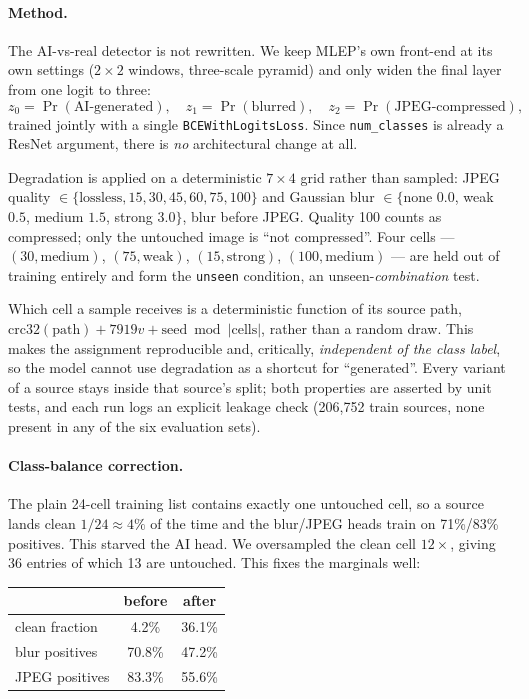\paragraph{Method.} The AI-vs-real detector is not rewritten. We keep MLEP's own
front-end at its own settings ($2\times2$ windows, three-scale pyramid) and only
widen the final layer from one logit to three:
\[
  z_0 = \Pr(\text{AI-generated}), \quad
  z_1 = \Pr(\text{blurred}), \quad
  z_2 = \Pr(\text{JPEG-compressed}),
\]
trained jointly with a single \texttt{BCEWithLogitsLoss}. Since \texttt{num\_classes}
is already a ResNet argument, there is \emph{no} architectural change at all.

Degradation is applied on a deterministic $7 \times 4$ grid rather than
sampled: JPEG quality $\in \{\text{lossless}, 15, 30, 45, 60, 75, 100\}$ and
Gaussian blur $\in \{$none $0.0$, weak $0.5$, medium $1.5$, strong $3.0\}$,
blur before JPEG. Quality 100 counts as compressed; only the untouched image is
``not compressed''. Four cells --- $(30,\text{medium})$, $(75,\text{weak})$,
$(15,\text{strong})$, $(100,\text{medium})$ --- are held out of training entirely
and form the \texttt{unseen} condition, an unseen-\emph{combination} test.

Which cell a sample receives is a deterministic function of its source path,
$\text{crc32}(\text{path}) + 7919v + \text{seed} \bmod |\text{cells}|$, rather
than a random draw. This makes the assignment reproducible and, critically,
\emph{independent of the class label}, so the model cannot use degradation as a
shortcut for ``generated''. Every variant of a source stays inside that source's
split; both properties are asserted by unit tests, and each run logs an explicit
leakage check (206{,}752 train sources, none present in any of the six
evaluation sets).

\paragraph{Class-balance correction.} The plain 24-cell training list contains
exactly one untouched cell, so a source lands clean $1/24 \approx 4\%$ of the
time and the blur/JPEG heads train on 71\%/83\% positives. This starved the AI
head. We oversampled the clean cell $12\times$, giving 36 entries of which 13
are untouched. This fixes the marginals well:

\begin{center}
\begin{tabular}{lcc}
  \toprule
   & before & after \\
  \midrule
  clean fraction   & 4.2\%  & 36.1\% \\
  blur positives   & 70.8\% & 47.2\% \\
  JPEG positives   & 83.3\% & 55.6\% \\
  \bottomrule
\end{tabular}
\end{center}

